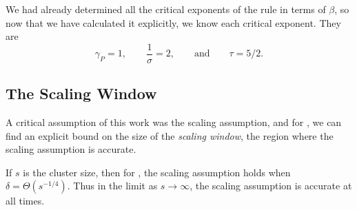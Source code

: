 \documentclass[twoside,10pt]{article}
\begin{document}
We had already determined all the critical exponents of the \ER rule in terms of $\beta$, so now that we have calculated it explicitly, we know each critical exponent. They are
\[
	\gamma_{P} = 1, \qquad \frac{1}{\sigma} =2, \qquad\text{and}\qquad \tau =5/2.
\] 

\subsection{The Scaling Window}

A critical assumption of this work was the scaling assumption, and for \ER, we can find an explicit bound on the size of the \textit{scaling window}, the region where the scaling assumption is accurate.

\begin{thrm}[]
	If $s$ is the cluster size, then for \ER, the scaling assumption holds when $\delta = \Theta(s^{-1/4})$. Thus in the limit as $s\to \infty$, the scaling assumption is accurate at all times.
\end{thrm}
\end{document}
